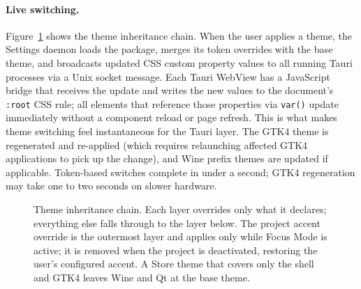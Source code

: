 \paragraph{Live switching.}
Figure~\ref{fig:theme-chain} shows the theme inheritance chain. When the user
applies a theme, the Settings daemon loads the package, merges its token
overrides with the base theme, and broadcasts updated CSS custom property values
to all running Tauri processes via a Unix socket message. Each Tauri WebView
has a JavaScript bridge that receives the update and writes the new values to
the document's \texttt{:root} CSS rule; all elements that reference those
properties via \texttt{var()} update immediately without a component reload or
page refresh. This is what makes theme switching feel instantaneous for the
Tauri layer. The GTK4 theme is regenerated and re-applied (which requires
relaunching affected GTK4 applications to pick up the change), and Wine prefix
themes are updated if applicable. Token-based switches complete in under a
second; GTK4 regeneration may take one to two seconds on slower hardware.

\begin{figure}[htbp]
\centering
{}
\caption{Theme inheritance chain. Each layer overrides only what it declares;
everything else falls through to the layer below. The project accent override
is the outermost layer and applies only while Focus Mode is active; it is
removed when the project is deactivated, restoring the user's configured
accent. A Store theme that covers only the shell and GTK4 leaves Wine and Qt
at the base theme.}
\label{fig:theme-chain}
\end{figure}
